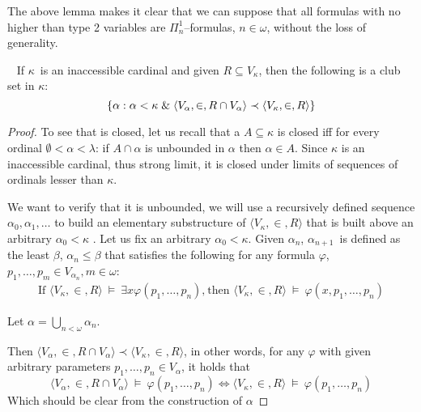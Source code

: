 The above lemma makes it clear that we can suppose that all formulas with no higher than type 2 variables are $\Pi^1_n$–formulas, $n \in \omega$, without the loss of generality.

\begin{lemma}\label{lemma:inaccessible_clubset}\ %
If $\kappa$ is an inaccessible cardinal and given $R \subseteq V_\kappa$, then the following is a club set in $\kappa$:
\begin{equation}
\{\alpha : \alpha < \kappa \mathrel{\&} \langle V_\alpha, \in, R \cap V_\alpha \rangle \prec \langle V_\kappa, \in, R \rangle \}\label{eq:inacc_lemma_set}
\end{equation}
\end{lemma}

\begin{proof}
To see that  is closed, let us recall that a $A \subseteq \kappa$ is closed iff for every ordinal $\emptyset < \alpha < \lambda$: if $A \cap \alpha$ is unbounded in $\alpha$ then $\alpha \in A$. Since $\kappa$ is an inaccessible cardinal, thus strong limit, it is closed under limits of sequences of ordinals lesser than $\kappa$.  


We want to verify that it is unbounded, we will use a recursively defined sequence $\alpha_0, \alpha_1, \ldots$
to build an elementary substructure of $\langle V_\kappa, \in, R \rangle$ that is built above an arbitrary $\alpha_0 <\kappa$ .
Let us fix an arbitrary $\alpha_0 < \kappa$. Given $\alpha_n$, $\alpha_{n+1}$ is defined as the least $\beta$, $\alpha_n \leq \beta$ that satisfies 
the following for any formula $\varphi$, $p_1, \ldots, p_m \in V_{\alpha_{n}}, m \in \omega$:
\begin{equation}
\begin{gathered}
\mbox{If }\langle V_\kappa, \in, R \rangle~\models~\exists x \varphi(p_1, \ldots, p_n)\mbox{,}\
\mbox{then }\langle V_\kappa, \in, R \rangle~\models~\varphi(x, p_1, \ldots, p_n)
\end{gathered}
\end{equation}

Let $\alpha = \bigcup_{n < \omega} \alpha_n$. 

Then $\langle V_\alpha, \in, R \cap V_\alpha \rangle \prec \langle V_\kappa, \in, R \rangle$, in other words, for any $\varphi$ with given arbitrary parameters $p_1, \ldots, p_n \in V_\alpha$, it holds that
\begin{equation}
\langle V_\alpha, \in, R \cap V_\alpha \rangle~\models~\varphi(p_1, \ldots, p_n) \iff \langle V_\kappa, \in, R \rangle~\models~\varphi(p_1, \ldots, p_n)
\end{equation}
Which should be clear from the construction of $\alpha$
\end{proof}

